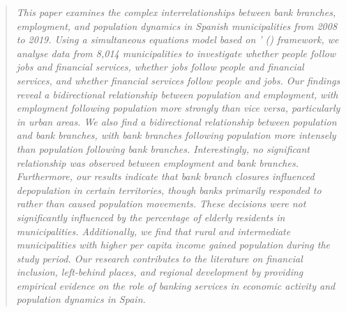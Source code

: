 \documentclass[a4paper,11pt,oneside]{article}
\begin{document}
\begin{spacing}{1}


\maketitle

\thispagestyle{empty}




\begin{abstract}





\textsl{This paper examines the complex interrelationships between bank branches, employment, and population dynamics in Spanish municipalities from 2008 to 2019. Using a simultaneous equations model based on \citeauthor{carlino1987determinants}' (\citeyear{carlino1987determinants}) framework, we analyse data from 8,014 municipalities to investigate whether people follow jobs and financial services, whether jobs follow people and financial services, and whether financial services follow people and jobs. Our findings reveal a bidirectional relationship between population and employment, with employment following population more strongly than vice versa, particularly in urban areas. We also find a bidirectional relationship between population and bank branches, with bank branches following population more intensely than population following bank branches. Interestingly, no significant relationship was observed between employment and bank branches. Furthermore, our results indicate that bank branch closures influenced depopulation in certain territories, though banks primarily responded to rather than caused population movements. These decisions were not significantly influenced by the percentage of elderly residents in municipalities. Additionally, we find that rural and intermediate municipalities with higher per capita income gained population during the study period. Our research contributes to the literature on financial inclusion, left-behind places, and regional development by providing empirical evidence on the role of banking services in economic activity and population dynamics in Spain.}

\end{abstract}



\vspace{0.6cm}

\\


\end{spacing}
\end{document}

